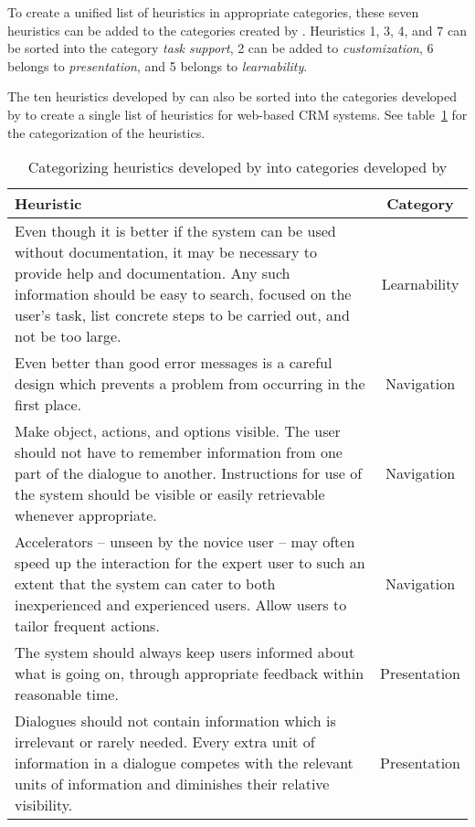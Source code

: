 To create a unified list of heuristics in appropriate categories, these seven heuristics can be added to the categories created by \citet{Singh2009}. Heuristics 1, 3, 4, and 7 can be sorted into the category \textit{task support}, 2 can be added to \textit{customization}, 6 belongs to \textit{presentation}, and 5 belongs to \textit{learnability}.

The ten heuristics developed by \citet{Nielsen1994a} can also be sorted into the categories developed by \citet{Singh2009} to create a single list of heuristics for web-based CRM systems. See table~\ref{tab:nielsen_to_singh} for the categorization of the heuristics.

\begin{table}[htbp]
	\centering
	\caption{Categorizing heuristics developed by \citet{Nielsen1994a} into categories developed by \citet{Singh2009}}
	\label{tab:nielsen_to_singh}
	\begin{tabularx}{\textwidth}{Xc} \toprule
		\textbf{Heuristic} & \textbf{Category} \\ \midrule
		Even though it is better if the system can be used without documentation, it may be necessary to provide help and documentation. Any such information should be easy to search, focused on the user's task, list concrete steps to be carried out, and not be too large. & Learnability \\
		Even better than good error messages is a careful design which prevents a problem from occurring in the first place. & Navigation \\
		Make object, actions, and options visible. The user should not have to remember information from one part of the dialogue to another. Instructions for use of the system should be visible or easily retrievable whenever appropriate. & Navigation \\
		Accelerators -- unseen by the novice user -- may often speed up the interaction for the expert user to such an extent that the system can cater to both inexperienced and experienced users. Allow users to tailor frequent actions. & Navigation \\
		The system should always keep users informed about what is going on, through appropriate feedback within reasonable time. & Presentation \\
		Dialogues should not contain information which is irrelevant or rarely needed. Every extra unit of information in a dialogue competes with the relevant units of information and diminishes their relative visibility. & Presentation \\

\end{tabularx}
\end{table}
